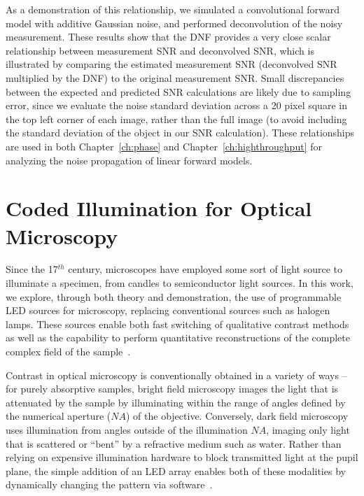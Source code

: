 As a demonstration of this relationship, we simulated a convolutional forward model with additive Gaussian noise, and performed deconvolution of the noisy measurement. These results show that the DNF provides a very close scalar relationship between measurement SNR and deconvolved SNR, which is illustrated by comparing the estimated measurement SNR (deconvolved SNR multiplied by the DNF) to the original measurement SNR. Small discrepancies between the expected and predicted SNR calculations are likely due to sampling error, since we evaluate the noise standard deviation across a 20 pixel square in the top left corner of each image, rather than the full image (to avoid including the standard deviation of the object in our SNR calculation). These relationships are used in both Chapter~\ref{ch:phase} and Chapter~\ref{ch:highthroughput} for analyzing the noise propagation of linear forward models.



\section{Coded Illumination for Optical Microscopy}
Since the 17$^{th}$ century, microscopes have employed some sort of light source to illuminate a specimen, from candles to semiconductor light sources. In this work, we explore, through both theory and demonstration, the use of programmable LED sources for microscopy, replacing conventional sources such as halogen lamps. These sources enable both fast switching of qualitative contrast methods~\cite{Zheng2011, albeanu2008led} as well as the capability to perform quantitative reconstructions of the complete complex field of the sample~\cite{Tian3dDpc, Zheng2013, tian2015quantitative}.

Contrast in optical microscopy is conventionally obtained in a variety of ways – for purely absorptive samples, bright field microscopy images the light that is attenuated by the sample by illuminating within the range of angles defined by the numerical aperture ($NA$) of the objective. Conversely, dark field microscopy uses illumination from angles outside of the illumination $NA$, imaging only light that is scattered or “bent” by a refractive medium such as water. Rather than relying on expensive illumination hardware to block transmitted light at the pupil plane, the simple addition of an LED array enables both of these modalities by dynamically changing the pattern via software~\cite{Zheng2011, zijiMulti}.


